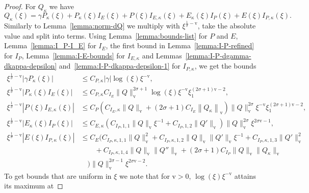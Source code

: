 \documentclass[11pt]{article}
\newcommand{\normv}{\mathrm{v}}
\begin{document}
\begin{proof}
  For \(Q_\kappa\) we have
  \begin{equation*}
    Q_{\kappa}(\xi)
    = \gamma P_{\kappa}(\xi)
    + P_{\kappa}(\xi)I_{E}(\xi)
    + P(\xi)I_{E,\kappa}(\xi)
    + E_{\kappa}(\xi)I_{P}(\xi)
    + E(\xi)I_{P,\kappa}(\xi).
  \end{equation*}
  Similarly to Lemma~\ref{lemma:norm-dQ} we multiply with
  \(\xi^{\frac{1}{\sigma} - \normv}\), take the absolute value and
  split into terms. Using Lemma~\ref{lemma:bounds-list} for \(P\) and
  \(E\), Lemma~\ref{lemma:I_P-I_E} for \(I_{E}\), the first bound in
  Lemma~\ref{lemma:I-P-refined} for \(I_{P}\),
  Lemma~\ref{lemma:I-E-bounds} for \(I_{E,\kappa}\) and
  Lemmas~\ref{lemma:I-P-dgamma-dkappa-depsilon}
  and~\ref{lemma:I-P-dkappa-depsilon-1} for \(I_{P,\kappa}\), we get
  the bounds
  \begin{align*}
    \xi^{\frac{1}{\sigma} - \normv}\left|\gamma P_{\kappa}(\xi)\right|
    &\leq C_{P,\kappa}|\gamma|\log(\xi)\xi^{-\normv},\\
    \xi^{\frac{1}{\sigma} - \normv}\left|P_{\kappa}(\xi)I_{E}(\xi)\right|
    &\leq C_{P,\kappa}C_{I_{E}}
      \|Q\|_{\normv}^{2\sigma + 1}\log(\xi)\xi^{-\normv}\xi_{1}^{(2\sigma + 1)\normv - 2},\\
    \xi^{\frac{1}{\sigma} - \normv}\left|P(\xi)I_{E,\kappa}(\xi)\right|
    &\leq C_{P}
      (
      C_{I_{E},\kappa}\|Q\|_{\normv}
      + (2\sigma + 1)C_{I_{E}}\left\|Q_{\kappa}\right\|_{\normv}
      )\|Q\|_{\normv}^{2\sigma}\xi^{-\normv}\xi_{1}^{(2\sigma + 1)\normv - 2},\\
    \xi^{\frac{1}{\sigma} - \normv}\left|E_{\kappa}(\xi)I_{P}(\xi)\right|
    &\leq C_{E,\kappa}
      (C_{I_{P},1,1}\|Q\|_{\normv}\xi^{-1} + C_{I_{P},1,2}\|Q'\|_{\normv})\|Q\|_{\normv}^{2\sigma}
      \xi^{2\sigma\normv - 1},\\
    \xi^{\frac{1}{\sigma} - \normv}\left|E(\xi)I_{P,\kappa}(\xi)\right|
    &\leq C_{E}\Big(C_{I_{P},\kappa,1,1}\|Q\|_{\normv}^{2}
    + C_{I_{P},\kappa,1,2}\|Q\|_{\normv}\|Q'\|_{\normv}\xi^{-1}
      + C_{I_{P},\kappa,1,3}\|Q'\|_{\normv}^{2}\\
    &\qquad+ C_{I_{P},\kappa,1,4}\|Q\|_{\normv}\|Q''\|_{\normv}
      + (2\sigma + 1)C_{I_{P}}\|Q\|_{\normv}\|Q_{\kappa}\|_{\normv}\\
    &\quad\Big)\|Q\|_{\normv}^{2\sigma - 1}\xi^{2\sigma\normv - 2}.
  \end{align*}
  To get bounds that are uniform in \(\xi\) we note that for
  \(\normv > 0\), \(\log(\xi)\xi^{-\normv}\) attains its maximum at

\end{proof}
\end{document}
